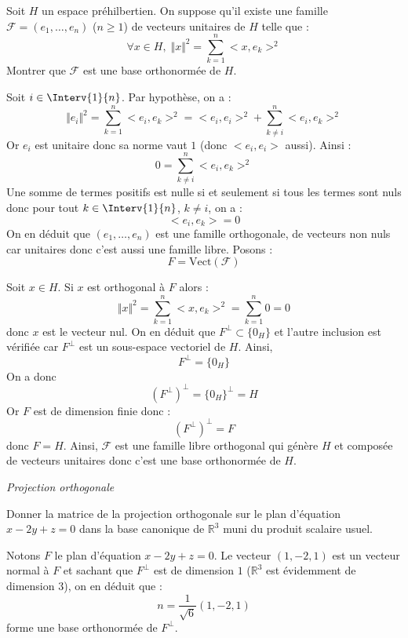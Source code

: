 \documentclass[a4paper,10pt]{report}
\begin{document}
 
\begin{Exercice}{} Soit $H$ un espace préhilbertien. On suppose qu'il existe une famille $\mathcal{F}=(e_1, \ldots, e_n)$ ($n \geq 1$) de vecteurs unitaires de $H$ telle que :
$$ \forall x \in H, \; \Vert x \Vert^2= \sum_{k=1}^n <x,e_k>^2 $$
Montrer que $\mathcal{F}$ est une base orthonormée de $H$.
\end{Exercice}

\corr Soit $i \in \Interv{1}{n}$. Par hypothèse, on a :
$$ \Vert e_i \Vert^2= \sum_{k=1}^n <e_i,e_k>^2 = <e_i,e_i>^2 + \sum_{k \neq i}^n <e_i,e_k>^2 $$
Or $e_i$ est unitaire donc sa norme vaut $1$ (donc $<e_i,e_i>$ aussi). Ainsi :
$$ 0 =  \sum_{k \neq i}^n <e_i,e_k>^2 $$
Une somme de termes positifs est nulle si et seulement si tous les termes sont nuls donc pour tout $k \in \Interv{1}{n}$, $k \neq i$, on a :
$$<e_i,e_k>=0$$
On en déduit que $(e_1, \ldots, e_n)$ est une famille orthogonale, de vecteurs non nuls car unitaires donc c'est aussi une famille libre. Posons :
$$ F = \textrm{Vect}(\mathcal{F})$$

\medskip

\noindent Soit $x \in H$. Si $x$ est orthogonal à $F$ alors :
$$ \Vert x \Vert^2= \sum_{k=1}^n <x,e_k>^2 = \sum_{k=1}^n  0 = 0$$
donc $x$ est le vecteur nul. On en déduit que $F^{\perp} \subset \lbrace 0_H \rbrace$ et l'autre inclusion est vérifiée car $F^{\perp}$ est un sous-espace vectoriel de $H$. Ainsi,
$$ F^{\perp} = \lbrace 0_H \rbrace$$
On a donc 
$$ (F^{\perp})^{\perp} = \lbrace 0_H \rbrace^{\perp} = H$$
Or $F$ est de dimension finie donc :
$$ (F^{\perp})^{\perp} = F$$
donc $F=H$. Ainsi, $\mathcal{F}$ est une famille libre orthogonal qui génère $H$ et composée de vecteurs unitaires donc c'est une base orthonormée de $H$.



\medskip

\begin{center}
\textit{{ {\large Projection orthogonale}}}
\end{center}

\medskip

\begin{Exercice}{} Donner la matrice de la projection orthogonale sur le plan d'équation $x-2y+z=0$ dans la base canonique de $\mathbb{R}^3$ muni du produit scalaire usuel.
\end{Exercice}

\corr Notons $F$ le plan d'équation $x-2y+z=0$. Le vecteur $(1,-2,1)$ est un vecteur normal à $F$ et sachant que $F^{\perp}$ est de dimension $1$ ($\mathbb{R}^3$ est évidemment de dimension $3$), on en déduit que :
$$ n = \dfrac{1}{\sqrt{6}} (1,-2,1)$$
forme une base orthonormée de $F^{\perp}$. 
\end{document}
